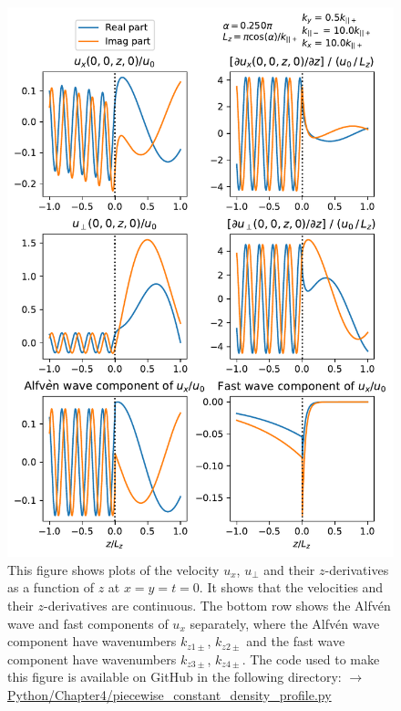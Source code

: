 \begin{figure}
    \centering
    \vspace{-20pt}
    \includegraphics[width=\textwidth,height=0.94\textheight,keepaspectratio]{figures/chapter04/piecewise_constant_density_profile.pdf}
    \vspace{-10pt}
    \caption{This figure shows plots of the velocity $u_x$, $u_\perp$ and their $z$-derivatives as a function of $z$ at $x=y=t=0$. It shows that the velocities and their $z$-derivatives are continuous. The bottom row shows the Alfv\'en wave and fast components of $u_x$ separately, where the Alfv\'en wave component have wavenumbers $k_{z1\pm}$, $k_{z2\pm}$ and the fast wave component have wavenumbers $k_{z3\pm}$, $k_{z4\pm}$. The code used to make this figure is available on GitHub in the following directory:\newline
    \href{https://github.com/aleksyprok/apkp_thesis/blob/main/Python/Chapter4/piecewise_constant_density_profile.py}{$\rightarrow$ Python/Chapter4/piecewise\_constant\_density\_profile.py}}
    \vspace{-20pt}
    \label{fig:piecewise_constant_density_profile}
\end{figure}

